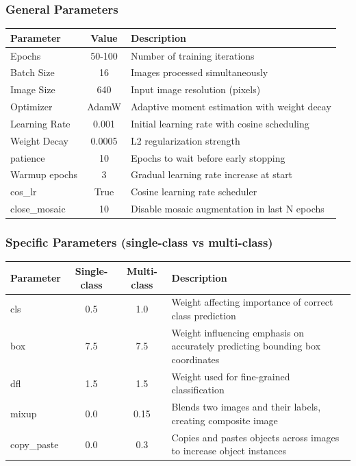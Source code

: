 \documentclass[serif]{beamer}  %
\begin{document}
\begin{frame}
\frametitle{General Parameters}
\begin{center}
\small
\begin{tabular}{|l|c|p{5.5cm}|}
\hline
\textbf{Parameter} & \textbf{Value} & \textbf{Description} \\
\hline
Epochs & 50-100 & Number of training iterations \\
\hline
Batch Size & 16 & Images processed simultaneously \\
\hline
Image Size & 640 & Input image resolution (pixels) \\
\hline
Optimizer & AdamW & Adaptive moment estimation with weight decay \\
\hline
Learning Rate & 0.001 & Initial learning rate with cosine scheduling \\
\hline
Weight Decay & 0.0005 & L2 regularization strength \\
\hline
patience & 10 & Epochs to wait before early stopping \\
\hline
Warmup epochs & 3 & Gradual learning rate increase at start \\
\hline
cos\_lr & True & Cosine learning rate scheduler \\
\hline
close\_mosaic & 10 & Disable mosaic augmentation in last N epochs \\
\hline
\end{tabular}
\end{center}
\end{frame}


\begin{frame}
\frametitle{Specific Parameters (single-class vs multi-class)}
\begin{center}
\small
\begin{tabular}{|l|c|c|p{4cm}|}
\hline
	\textbf{Parameter} & \textbf{Single-class} & \textbf{Multi-class} & \textbf{Description} \\
\hline
cls & 0.5 & 1.0 & Weight affecting importance of correct class prediction\\
\hline
box & 7.5 & 7.5 & Weight influencing emphasis on accurately predicting bounding box coordinates\\
\hline
dfl & 1.5 & 1.5 & Weight used for fine-grained classification\\
\hline
mixup & 0.0 & 0.15 & Blends two images and their labels, creating composite image\\
\hline
copy\_paste & 0.0 & 0.3 & Copies and pastes objects across images to increase object instances\\
\hline
\end{tabular}
\end{center}
\end{frame}
\end{document}
